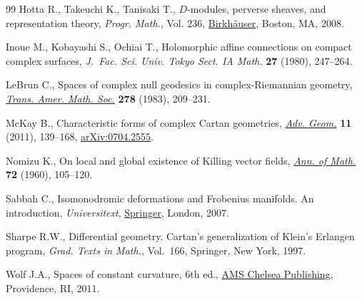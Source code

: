 \begin{thebibliography}{99}
Hotta R., Takeuchi K., Tanisaki T., {$D$}-modules, perverse sheaves, and
 representation theory, \textit{Progr. Math.}, Vol. 236, \href{https://doi.org/10.1007/978-0-8176-4523-6}{Birkh\"auser}, Boston,
 MA, 2008.

Inoue M., Kobayashi S., Ochiai T., Holomorphic affine connections on compact
 complex surfaces, \textit{J.~Fac. Sci. Univ. Tokyo Sect. IA Math.}
 \textbf{27} (1980), 247--264.

LeBrun C., Spaces of complex null geodesics in complex-{R}iemannian geometry,
 \href{https://doi.org/10.2307/1999312}{\textit{Trans. Amer. Math. Soc.}} \textbf{278} (1983), 209--231.

McKay B., Characteristic forms of complex {C}artan geometries, \href{https://doi.org/10.1515/ADVGEOM.2010.044}{\textit{Adv.
 Geom.}} \textbf{11} (2011), 139--168, \href{https://arxiv.org/abs/0704.2555}{arXiv:0704.2555}.

Nomizu K., On local and global existence of {K}illing vector fields,
\href{https://doi.org/10.2307/1970148}{\textit{Ann. of Math.}} \textbf{72} (1960), 105--120.

Sabbah C., Isomonodromic deformations and {F}robenius manifolds. An
 introduction, \textit{Universitext}, \href{https://doi.org/10.1007/978-1-84800-054-4}{Springer}, London, 2007.

Sharpe R.W., Differential geometry. Cartan's generalization of Klein's Erlangen
 program, \textit{Grad. Texts in Math.}, Vol.~166, Springer, New York, 1997.

Wolf J.A., Spaces of constant curvature, 6th ed., \href{https://doi.org/10.1090/chel/372}{AMS Chelsea Publishing},
 Providence, RI, 2011.

\end{thebibliography}
